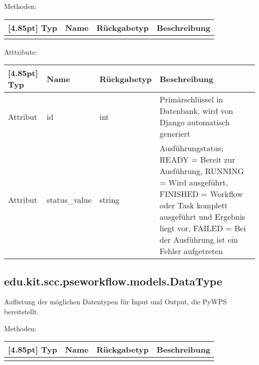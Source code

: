 			Methoden:
			\begin{center}
				\setlength\tabcolsep{5pt}
				\renewcommand{\arraystretch}{1.5}
				
				\begin{tabularx}{\textwidth}{|l|l|l|X|}
					\hline
					\rowcolor[gray]{0.75}[4.85pt]
					Typ & Name & Rückgabetyp & Beschreibung \\ \hline
					&&& \\ 
					\hline
				\end{tabularx}
			\end{center}
			
			Atttribute:
			\begin{center}
				\setlength\tabcolsep{5pt}
				\renewcommand{\arraystretch}{1.5}
				
				\begin{tabularx}{\textwidth}{|l|l|l|X|}
					\hline
					\rowcolor[gray]{0.75}[4.85pt]
					Typ & Name & Rückgabetyp & Beschreibung \\ \hline 
	           		Attribut & id & int & Primärschlüssel in Datenbank, wird von Django automatisch generiert \\ \hline
	           		Attribut & status\_value & string & Ausführungstatus; READY = Bereit zur Ausführung, RUNNING = Wird ausgeführt, FINISHED = Workflow oder Task komplett ausgeführt und Ergebnis liegt vor, FAILED = Bei der Ausführung ist ein Fehler aufgetreten \\
	           		\hline
				\end{tabularx}
			\end{center}

		\subsection{edu.kit.scc.pseworkflow.models.DataType}
			Auflistung der möglichen Datentypen für Input und Output, die PyWPS bereitstellt.
			
			Methoden:
			\begin{center}
				\setlength\tabcolsep{5pt}
				\renewcommand{\arraystretch}{1.5}
				
				\begin{tabularx}{\textwidth}{|l|l|l|X|}
					\hline
					\rowcolor[gray]{0.75}[4.85pt]
					Typ & Name & Rückgabetyp & Beschreibung \\ \hline 
					&&& \\
					\hline
				\end{tabularx}
			\end{center}
			
